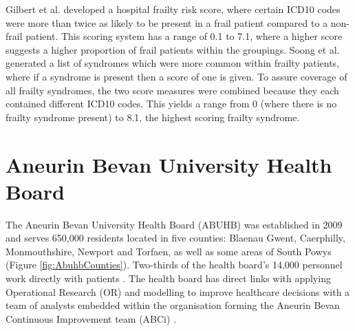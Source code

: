 \documentclass[../thesis.tex]{subfiles}
\begin{document}
\begin{table}[h!]
    \centering{}
    \caption{S42.201A - Example ICD10 code that shows the categorisation of each sublevel of ICD10. The first three characters provide a high level description of the category, where each additional character increases the diagnostic complexity~\cite{WHOICD}.}
    \label{tab:icd10}
\end{table}

Gilbert et al. \cite{Gilbert2018} developed a hospital frailty risk score, where certain ICD10 codes were more than twice as likely to be present in a frail patient compared to a non-frail patient. This scoring system has a range of 0.1 to 7.1, where a higher score suggests a higher proportion of frail patients within the groupings. Soong et al. \cite{Soong2015} generated a list of syndromes which were more common within frailty patients, where if a syndrome is present then a score of one is given. To assure coverage of all frailty syndromes, the two score measures were combined because they each contained different ICD10 codes. This yields a range from 0 (where there is no frailty syndrome present) to 8.1, the highest scoring frailty syndrome.

\section{Aneurin Bevan University Health Board}\label{sec:ABUHB}

The Aneurin Bevan University Health Board (ABUHB) was established in 2009 and serves 650,000 residents located in five counties: Blaenau Gwent, Caerphilly, Monmouthshire, Newport and Torfaen, as well as some areas of South Powys (Figure \ref{fig:AbuhbCounties}). Two-thirds of the health board's 14,000 personnel work directly with patients \cite{UniAneurinBevanHealthBoardb}. The health board has direct links with applying Operational Research (OR) and modelling to improve healthcare decisions with a team of analysts embedded within the organisation forming the Aneurin Bevan Continuous Improvement team (ABCi) \cite{UniAneurinBevanHealthBoarda}.
\end{document}
